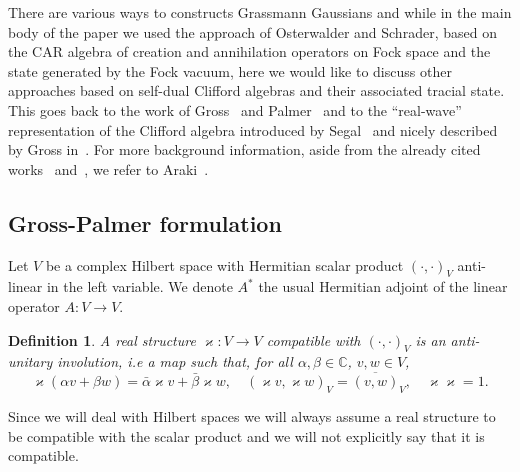 \documentclass{article}
\newcommand{\cdummy}{\cdot}
\newtheorem{definition}[theorem]{Definition}
\begin{document}
There are various ways to constructs Grassmann Gaussians and while in the
main body of the paper we used the approach of Osterwalder and Schrader, based
on the CAR algebra of creation and annihilation operators on Fock space and
the state generated by the Fock vacuum, here we would like to discuss other
approaches based on self-dual Clifford algebras and their associated tracial
state. This goes back to the work of Gross~{\cite{Gross_Euclidean_1976}} and
Palmer~{\cite{palmer_euclidean_1980}} and to the ``real-wave'' representation
of the Clifford algebra introduced by
Segal~{\cite{segal_tensor_1956,Segalbook}} and nicely described by Gross
in~{\cite{gross_existence_1972}}. For more background information, aside from
the already cited works~{\cite{Gross_Euclidean_1976}}
and~{\cite{palmer_euclidean_1980}}, we refer to
Araki~{\cite{araki_representations_1964,araki_diagonalization_1968,araki_quasifree_1970}}.

\subsection{Gross-Palmer formulation}

Let $V$ be a complex Hilbert space with Hermitian scalar product $(\cdot,
\cdot)_V$ anti-linear in the left variable. We denote $A^{\ast}$ the usual
Hermitian adjoint of the linear operator $A : V \rightarrow V$.

\begin{definition}
  \label{GPdef:real-str}A real structure $\varkappa : V \rightarrow V$
  compatible with $(\cdummy, \cdummy)_V$ is an anti-unitary involution, i.e a
  map such that, for all $\alpha, \beta \in \mathbb{C}$, $v, w \in V$,
  \[ \varkappa (\alpha v + \beta w) = \bar{\alpha} \varkappa v + \bar{\beta}
     \varkappa w, \quad (\varkappa v, \varkappa w)_V = \overline{(v, w)}_V,
     \quad \varkappa \varkappa = 1. \]
\end{definition}

\begin{remark*}
  Since we will deal with Hilbert spaces we will always assume a real
  structure to be compatible with the scalar product and we will not
  explicitly say that it is compatible. 
\end{remark*}
\end{document}
